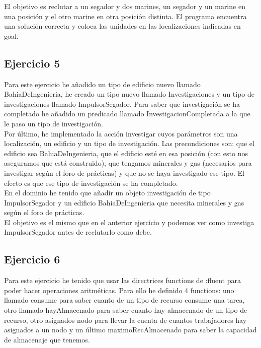 \documentclass[a4paper,11pt]{article}
\begin{document}
El objetivo es reclutar a un segador y dos marines, un segador y un marine en una posición y el otro marine en otra posición distinta. El programa encuentra una solución correcta y coloca las unidades en las localizaciones indicadas en goal.

\subsection{Ejercicio 5}

Para este ejercicio he añadido un tipo de edificio nuevo llamado BahiaDeIngenieria, he creado un tipo nuevo llamado Investigaciones y un tipo de investigaciones llamado ImpulsorSegador. Para saber que investigación se ha completado he añadido un predicado llamado InvestigacionCompletada a la que le paso un tipo de investigación.\\

Por último, he implementado la acción investigar cuyos parámetros son una localización, un edificio y un tipo de investigación. Las precondiciones son: que el edificio sea BahiaDeIngenieria, que el edificio esté en esa posición (con esto nos aseguramos que está construido), que tengamos minerales y gas (necesarios para investigar según el foro de prácticas) y que no se haya investigado ese tipo. El efecto es que ese tipo de investigación se ha completado.\\

En el dominio he tenido que añadir un objeto investigación de tipo ImpulsorSegador y un edificio BahiaDeIngenieria que necesita minerales y gas según el foro de prácticas.\\

El objetivo es el mismo que en el anterior ejercicio y podemos ver como investiga ImpulsorSegador antes de reclutarlo como debe.

\subsection{Ejercicio 6}

Para este ejercicio he tenido que usar las directrices functions de :fluent para poder hacer operaciones aritméticas. Para ello he definido 4 functions: uno llamado consume para saber cuanto de un tipo de recurso consume una tarea, otro llamado hayAlmacenado para saber cuanto hay almacenado de un tipo de recurso, otro asignados nodo para llevar la cuenta de cuantos trabajadores hay asignados a un nodo y un último maximoRecAlmacenado para saber la capacidad de almacenaje que tenemos.\\
\end{document}
